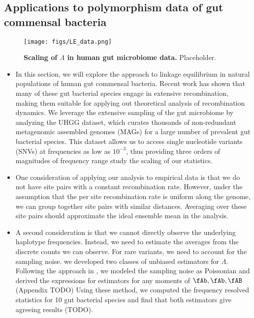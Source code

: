 \documentclass[aps,rmp,twocolumn,groupedaddress,floatfix,notitlepage]{revtex4-1}
\begin{document}
\newpage
\subsection*{Applications to polymorphism data of gut commensal bacteria}

\begin{figure*}[t]
\centering
\texttt{[image: figs/LE\_data.png]} 
\hfill
\caption{\textbf{Scaling of $\Lambda$ in human gut microbiome data.} Placeholder. \label{fig:data_LE}}
\end{figure*}

\begin{itemize}
    \item In this section, we will explore the approach to linkage equilibrium in natural populations of human gut commensal bacteria. Recent work has shown that many of these gut bacterial species engage in extensive recombination, making them suitable for applying out theoretical analysis of recombination dynamics. We leverage the extensive sampling of the gut microbiome by analyzing the UHGG dataset, which curates thousands of non-redundant metagenomic assembled genomes (MAGs) for a large number of prevalent gut bacterial species. This dataset allows us to access single nucleotide variants (SNVs) at frequencies as low as $10^{-3}$, thus providing three orders of magnitudes of frequency range study the scaling of our statistics.
    
    \item One consideration of applying our analysis to empirical data is that we do not have site pairs with a constant recombination rate. However, under the assumption that the per site recombination rate is uniform along the genome, we can group together site pairs with similar distances. Averaging over these site pairs should approximate the ideal ensemble mean in the analysis. 
    
    \item A second consideration is that we cannot directly observe the underlying haplotype frequencies. Instead, we need to estimate the averages from the discrete counts we can observe. For rare variants, we need to account for the sampling noise. we developed two classes of unbiased estimators for $\Lambda$. Following the approach in \parencite{}, we modeled the sampling noise as Poissonian and derived the expressions for estimators for any moments of $\fAb,\fAb, \fAB$ (Appendix TODO) Using these method, we computed the frequency resolved statistics for 10 gut bacterial species and find that both estimators give agreeing results (TODO).
    

\end{itemize}
\end{document}
